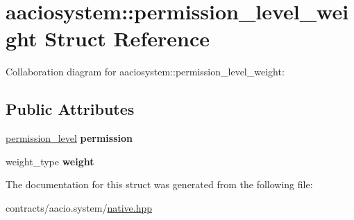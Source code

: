 \hypertarget{structaaciosystem_1_1permission__level__weight}{}\section{aaciosystem\+:\+:permission\+\_\+level\+\_\+weight Struct Reference}
\label{structaaciosystem_1_1permission__level__weight}


Collaboration diagram for aaciosystem\+:\+:permission\+\_\+level\+\_\+weight\+:
\subsection*{Public Attributes}
\begin{DoxyCompactItemize}
\item 
\mbox{\label{structaaciosystem_1_1permission__level__weight_ace34c7daa83204dcf69867fdc0d8c761}} 
\mbox{\hyperlink{structaacio_1_1permission__level}{permission\+\_\+level}} {\bfseries permission}
\item 
\mbox{\label{structaaciosystem_1_1permission__level__weight_ada2f024ea911a644098354fa556d143b}} 
weight\+\_\+type {\bfseries weight}
\end{DoxyCompactItemize}


The documentation for this struct was generated from the following file\+:\begin{DoxyCompactItemize}
\item 
contracts/aacio.\+system/\mbox{\hyperlink{native_8hpp}{native.\+hpp}}\end{DoxyCompactItemize}
